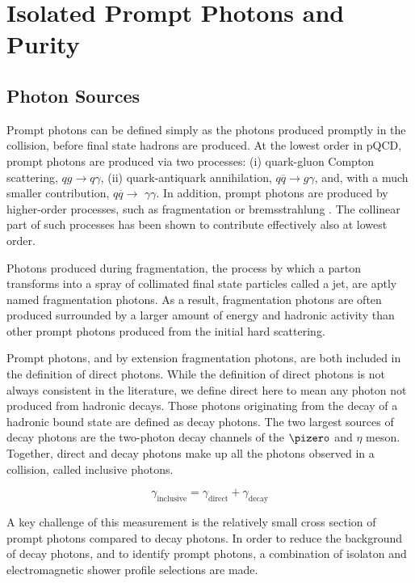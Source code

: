 \section{Isolated Prompt Photons and Purity}
 
\subsection{Photon Sources}
Prompt photons can be defined simply as the photons produced promptly in the collision, before final state hadrons are produced. At the lowest order in pQCD, prompt photons are produced via two processes: (i) quark-gluon Compton scattering, $qg \to q\gamma$, (ii) quark-antiquark annihilation, $q\overline{q} \to g\gamma$, and, with a much smaller contribution,  $q\overline{q}\to$ $\gamma\gamma$. In addition, prompt photons are produced by higher-order processes, such as fragmentation or bremsstrahlung \cite{AURENCHE199334}. The collinear part of such processes has been shown to contribute effectively also at lowest order.


Photons produced during fragmentation, the process by which a parton transforms into a spray of collimated final state particles called a jet, are aptly named fragmentation photons. As a result, fragmentation photons are often produced surrounded by a larger amount of energy and hadronic activity than other prompt photons produced from the initial hard scattering.

Prompt photons, and by extension fragmentation photons, are both included in the definition of direct photons. While the definition of direct photons is not always consistent in the literature, we define direct here to mean any photon not produced from hadronic decays. Those photons originating from the decay of a hadronic bound state are defined as decay photons. The two largest sources of decay photons are the two-photon decay channels of the $\pizero$ and $\eta$ meson.\\

Together, direct and decay photons make up all the photons observed in a collision, called inclusive photons.

$$ \gamma_\mathrm{inclusive} = \gamma_\mathrm{direct} + \gamma_\mathrm{decay}$$


A key challenge of this measurement is the relatively small cross section of prompt photons compared to decay photons. In order to reduce the background of decay photons, and to identify prompt photons, a combination of isolaton and electromagnetic shower profile selections are made.

